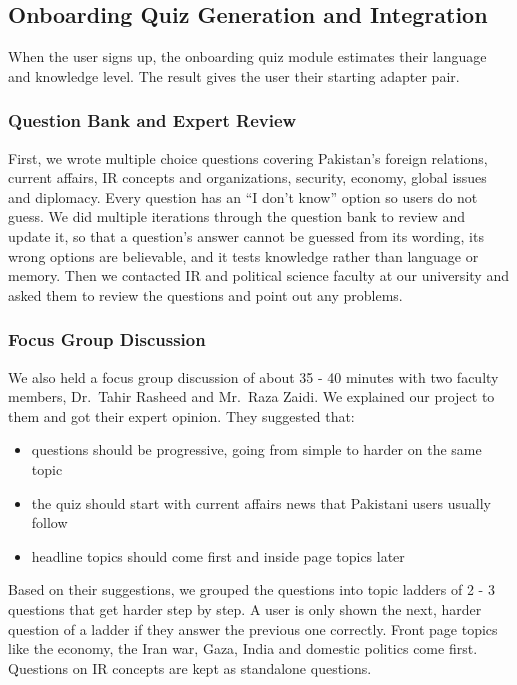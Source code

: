 \documentclass{FastFyp}
\begin{document}
\subsection{Onboarding Quiz Generation and Integration}
\label{subsec:impl-quiz}
When the user signs up, the onboarding quiz module estimates their language and knowledge level. The result gives the user their starting adapter pair.

\subsubsection{Question Bank and Expert Review}
First, we wrote multiple choice questions covering Pakistan's foreign relations, current affairs, IR concepts and organizations, security, economy, global issues and diplomacy. Every question has an ``I don't know'' option so users do not guess. We did multiple iterations through the question bank to review and update it, so that a question's answer cannot be guessed from its wording, its wrong options are believable, and it tests knowledge rather than language or memory. Then we contacted IR and political science faculty at our university and asked them to review the questions and point out any problems.

\subsubsection{Focus Group Discussion}
We also held a focus group discussion of about 35 - 40 minutes with two faculty members, Dr.\ Tahir Rasheed and Mr.\ Raza Zaidi. We explained our project to them and got their expert opinion. They suggested that:
\begin{itemize}
    \item questions should be progressive, going from simple to harder on the same topic
    \item the quiz should start with current affairs news that Pakistani users usually follow
    \item headline topics should come first and inside page topics later
\end{itemize}
Based on their suggestions, we grouped the questions into topic ladders of 2 - 3 questions that get harder step by step. A user is only shown the next, harder question of a ladder if they answer the previous one correctly. Front page topics like the economy, the Iran war, Gaza, India and domestic politics come first. Questions on IR concepts are kept as standalone questions.
\end{document}
